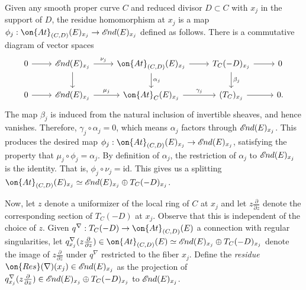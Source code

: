 \documentclass[12 pt]{amsart}
\theoremstyle{plain}
\theoremstyle{definition}
\theoremstyle{remark}
\numberwithin{equation}{section}
\newcommand*{\sheafend}{\mathscr{E}\kern -1pt nd}
\begin{document}
Given any smooth proper curve $C$ and reduced divisor $D \subset C$ with $x_j$ in the support of $D$,
the residue homomorphism at $x_j$ is a map ${\phi}_j: \on{At}_{(C,D)}(E)_{x_j}
\to \sheafend(E)_{x_j}$ defined as follows.
There is a commutative diagram of vector spaces
\begin{equation}
	\label{equation:}
	\begin{tikzcd}
		0 \ar {r} & \sheafend(E)_{x_j} \ar {r}{\nu_j} \ar {d} &
		\on{At}_{(C,D)}(E)_{x_j} \ar {r} \ar {d}{\alpha_j} & T_C(-D)_{x_j}
		\ar {r} \ar {d}{\beta_j} & 0 \\
		0 \ar {r} & \sheafend(E)_{x_j} \ar {r}{\mu_j} & \on{At}_C(E)_{x_j} \ar
		{r}{\gamma_j} & (T_C)_{x_j} \ar {r} & 0.
\end{tikzcd}\end{equation}
The map $\beta_j$ is induced from the natural inclusion of invertible sheaves, and
hence vanishes.
Therefore, $\gamma_j \circ \alpha_j = 0$, which means $\alpha_j$ factors through
$\sheafend(E)_{x_j}$. This produces the desired map
${\phi}_j: \on{At}_{(C,D)}(E)_{x_j} \to \sheafend(E)_{x_j}$,
satisfying the property that $\mu_j\circ \phi_j  = \alpha_j$.
By definition of $\alpha_j$, the restriction of $\alpha_j$ to $\sheafend(E)_{x_j}$ is the identity.
That is, $\phi_j\circ \nu_j   = \mathrm{id}$.
This gives us a splitting 
$\on{At}_{(C,D)}(E)_{x_j} \simeq  \sheafend(E)_{x_j} \oplus T_C(-D)_{x_j}$.

Now, let $z$ denote a uniformizer of the local ring of $C$ 
at $x_j$ and let $z \frac{\partial
}{\partial z}$ denote the corresponding section of $T_C(-D)$ at $x_j$.
Observe that this is independent of the choice of $z$.
Given $q^\nabla: T_C(-D) \to \on{At}_{(C,D)}(E)$ a connection with regular
singularities,
let $q^\nabla_{x_j}(z \frac{\partial }{\partial z}) \in \on{At}_{(C,D)}(E) \simeq  \sheafend(E)_{x_j} \oplus T_C(-D)_{x_j}$ denote the image of $z
\frac{\partial }{\partial z}$
under $q^\nabla$ restricted to the fiber $x_j$.
Define the {\em residue} $\on{Res}(\nabla)(x_j) \in \sheafend(E)_{x_j}$ as the
projection of 
$q^\nabla_{x_j}(z \frac{\partial }{\partial z}) \in \sheafend(E)_{x_j} \oplus T_C(-D)_{x_j}$ to $\sheafend(E)_{x_j}$.
\end{document}
